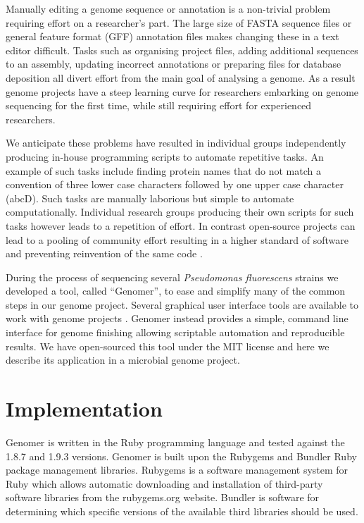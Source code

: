 \documentclass[10pt]{article}
\begin{document}
Manually editing a genome sequence or annotation is a non-trivial problem
requiring effort on a researcher's part. The large size of FASTA sequence files
or general feature format (GFF) annotation files makes changing these in a text
editor difficult. Tasks such as organising project files, adding additional
sequences to an assembly, updating incorrect annotations or preparing files for
database deposition all divert effort from the main goal of analysing a genome.
As a result genome projects have a steep learning curve for researchers
embarking on genome sequencing for the first time, while still requiring effort
for experienced researchers.

We anticipate these problems have resulted in individual groups independently
producing in-house programming scripts to automate repetitive tasks. An example
of such tasks include finding protein names that do not match a convention of
three lower case characters followed by one upper case character (abcD). Such
tasks are manually laborious but simple to automate computationally. Individual
research groups producing their own scripts for such tasks however leads to a
repetition of effort. In contrast open-source projects can lead to a pooling of
community effort resulting in a higher standard of software and preventing
reinvention of the same code \cite{ince2012}.

During the process of sequencing several \emph{Pseudomonas fluorescens} strains
we developed a tool, called ``Genomer'', to ease and simplify many of the
common steps in our genome project. Several graphical user interface tools are
available to work with genome projects \cite{tanaka2006, wilkinson2002,
lopez2011, carver2012, gordon2003}. Genomer instead provides a simple, command
line interface for genome finishing allowing scriptable automation and
reproducible results. We have open-sourced this tool under the MIT license and
here we describe its application in a microbial genome project.

\section*{Implementation}

Genomer is written in the Ruby programming language \cite{ruby-lang,goto2010}
and tested against the 1.8.7 and 1.9.3 versions. Genomer is built upon the
Rubygems and Bundler Ruby package management libraries. Rubygems is a software
management system for Ruby which allows automatic downloading and installation
of third-party software libraries from the rubygems.org website. Bundler is
software for determining which specific versions of the available third
libraries should be used.
\end{document}
